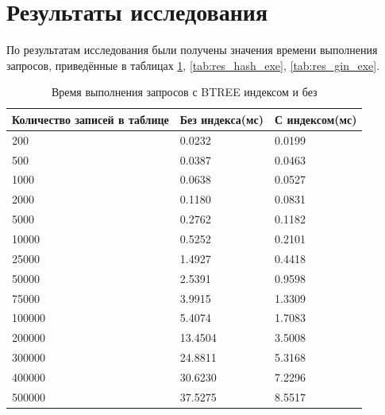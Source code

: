 



\section{Результаты исследования}

По результатам исследования были получены значения времени выполнения запросов, приведённые в таблицах
\ref{tab:res_btree_exe}, \ref{tab:res_hash_exe}, \ref{tab:res_gin_exe}.


\begin{table}[H]
	\centering
	\caption{Время выполнения запросов с BTREE индексом и без}
	\begin{tabular}{|p{5cm}|p{5cm}|p{5cm}|}
	\hline
	Количество записей в таблице & Без индекса(мс) & С индексом(мс) \\
	\hline
	200 & 0.0232 & 0.0199 \\
	\hline
	500 & 0.0387 & 0.0463 \\
	\hline
	1000 & 0.0638 & 0.0527 \\
	\hline
	2000 & 0.1180 & 0.0831 \\
	\hline
	5000 & 0.2762 & 0.1182 \\
	\hline
	10000 & 0.5252 & 0.2101 \\
	\hline
	25000 & 1.4927 & 0.4418 \\
	\hline
	50000 & 2.5391 & 0.9598 \\
	\hline
	75000 & 3.9915 & 1.3309 \\
	\hline
	100000 & 5.4074 & 1.7083 \\
	\hline
	200000 & 13.4504 & 3.5008 \\
	\hline
	300000 & 24.8811 & 5.3168 \\
	\hline
	400000 & 30.6230 & 7.2296 \\
	\hline
	500000 & 37.5275 & 8.5517 \\
	\hline
	\end{tabular}
	\label{tab:res_btree_exe}
\end{table}

